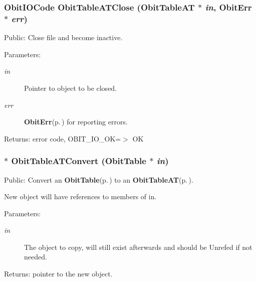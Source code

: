 \subsubsection{\setlength{\rightskip}{0pt plus 5cm}Obit\-IOCode Obit\-Table\-ATClose ({\bf Obit\-Table\-AT} $\ast$ {\em in}, {\bf Obit\-Err} $\ast$ {\em err})}\label{ObitTableAT_8c_a25}


Public: Close file and become inactive. 

\begin{Desc}
\item[Parameters:]
\begin{description}
\item[{\em in}]Pointer to object to be closed. \item[{\em err}]{\bf Obit\-Err}{\rm (p.\,\pageref{structObitErr})} for reporting errors. \end{description}
\end{Desc}
\begin{Desc}
\item[Returns:]error code, OBIT\_\-IO\_\-OK=$>$ OK \end{Desc}
\subsubsection{$\ast$ Obit\-Table\-ATConvert ({\bf Obit\-Table} $\ast$ {\em in})}\label{ObitTableAT_8c_a19}


Public: Convert an {\bf Obit\-Table}{\rm (p.\,\pageref{structObitTable})} to an {\bf Obit\-Table\-AT}{\rm (p.\,\pageref{structObitTableAT})}. 

New object will have references to members of in. \begin{Desc}
\item[Parameters:]
\begin{description}
\item[{\em in}]The object to copy, will still exist afterwards and should be Unrefed if not needed. \end{description}
\end{Desc}
\begin{Desc}
\item[Returns:]pointer to the new object. \end{Desc}

